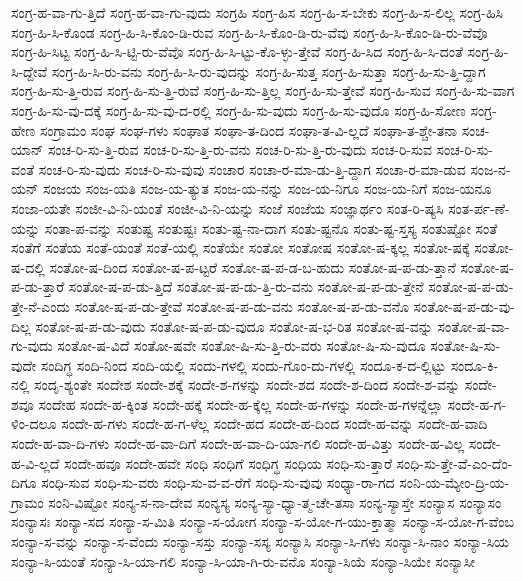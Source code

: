 {ಸಂಗ್ರ-ಹ-ವಾ-ಗು-ತ್ತಿದೆ
ಸಂಗ್ರ-ಹ-ವಾ-ಗು-ವುದು
ಸಂಗ್ರಹಿ
ಸಂಗ್ರ-ಹಿಸ
ಸಂಗ್ರ-ಹಿ-ಸ-ಬೇಕು
ಸಂಗ್ರ-ಹಿ-ಸ-ಲಿಲ್ಲ
ಸಂಗ್ರ-ಹಿಸಿ
ಸಂಗ್ರ-ಹಿ-ಸಿ-ಕೊಂಡ
ಸಂಗ್ರ-ಹಿ-ಸಿ-ಕೊಂ-ಡಿ-ರುವ
ಸಂಗ್ರ-ಹಿ-ಸಿ-ಕೊಂ-ಡಿ-ರು-ವೆವು
ಸಂಗ್ರ-ಹಿ-ಸಿ-ಕೊಂ-ಡಿ-ರು-ವೆವೊ
ಸಂಗ್ರ-ಹಿ-ಸಿಟ್ಟ
ಸಂಗ್ರ-ಹಿ-ಸಿ-ಟ್ಟಿ-ರು-ವೆವೊ
ಸಂಗ್ರ-ಹಿ-ಸಿ-ಟ್ಟು-ಕೊ-ಳ್ಳು-ತ್ತೇವೆ
ಸಂಗ್ರ-ಹಿ-ಸಿದ
ಸಂಗ್ರ-ಹಿ-ಸಿ-ದಂತೆ
ಸಂಗ್ರ-ಹಿ-ಸಿ-ದ್ದೇವೆ
ಸಂಗ್ರ-ಹಿ-ಸಿ-ರು-ವನು
ಸಂಗ್ರ-ಹಿ-ಸಿ-ರು-ವುದನ್ನು
ಸಂಗ್ರ-ಹಿ-ಸುತ್ತ
ಸಂಗ್ರ-ಹಿ-ಸುತ್ತಾ
ಸಂಗ್ರ-ಹಿ-ಸು-ತ್ತಿ-ದ್ದಾಗ
ಸಂಗ್ರ-ಹಿ-ಸು-ತ್ತಿ-ರುವ
ಸಂಗ್ರ-ಹಿ-ಸು-ತ್ತಿ-ರುವೆ
ಸಂಗ್ರ-ಹಿ-ಸು-ತ್ತಿಲ್ಲ
ಸಂಗ್ರ-ಹಿ-ಸು-ತ್ತೇವೆ
ಸಂಗ್ರ-ಹಿ-ಸುವ
ಸಂಗ್ರ-ಹಿ-ಸು-ವಾಗ
ಸಂಗ್ರ-ಹಿ-ಸು-ವು-ದಕ್ಕೆ
ಸಂಗ್ರ-ಹಿ-ಸು-ವು-ದ-ರಲ್ಲಿ
ಸಂಗ್ರ-ಹಿ-ಸು-ವುದು
ಸಂಗ್ರ-ಹಿ-ಸು-ವುದೊ
ಸಂಗ್ರ-ಹಿ-ಸೋಣ
ಸಂಗ್ರ-ಹೇಣ
ಸಂಗ್ರಾಮಂ
ಸಂಘ
ಸಂಘ-ಗಳು
ಸಂಘಾತ
ಸಂಘಾ-ತ-ದಿಂದ
ಸಂಘಾ-ತ-ವಿ-ಲ್ಲದೆ
ಸಂಘಾ-ತ-ಶ್ಚೇ-ತನಾ
ಸಂಚ-ಯಾನ್
ಸಂಚ-ರಿ-ಸು-ತ್ತಿ-ರುವ
ಸಂಚ-ರಿ-ಸು-ತ್ತಿ-ರು-ವನು
ಸಂಚ-ರಿ-ಸು-ತ್ತಿ-ರು-ವುದು
ಸಂಚ-ರಿ-ಸುವ
ಸಂಚ-ರಿ-ಸು-ವಂತೆ
ಸಂಚ-ರಿ-ಸು-ವುದು
ಸಂಚ-ರಿ-ಸು-ವುವು
ಸಂಚಾರ
ಸಂಚಾ-ರ-ಮಾ-ಡು-ತ್ತಿ-ದ್ದಾಗ
ಸಂಚಾ-ರ-ಮಾ-ಡುವ
ಸಂಜ-ನ-ಯನ್
ಸಂಜಯ
ಸಂಜ-ಯತಿ
ಸಂಜ-ಯ-ತ್ಯುತ
ಸಂಜ-ಯ-ನನ್ನು
ಸಂಜ-ಯ-ನಿಗೂ
ಸಂಜ-ಯ-ನಿಗೆ
ಸಂಜ-ಯನೂ
ಸಂಜಾ-ಯತೇ
ಸಂಜೀ-ವಿ-ನಿ-ಯಂತೆ
ಸಂಜೀ-ವಿ-ನಿ-ಯನ್ನು
ಸಂಜೆ
ಸಂಜೆಯ
ಸಂಜ್ಞಾರ್ಥಂ
ಸಂತ-ರಿ-ಷ್ಯಸಿ
ಸಂತ-ರ್ಪ-ಣೆ-ಯನ್ನು
ಸಂತಾ-ಪ-ವನ್ನು
ಸಂತುಷ್ಟ
ಸಂತುಷ್ಟಃ
ಸಂತು-ಷ್ಟ-ನಾ-ದಾಗ
ಸಂತು-ಷ್ಟನೊ
ಸಂತು-ಷ್ಟ-ಸ್ತಸ್ಯ
ಸಂತುಷ್ಟೋ
ಸಂತೆ
ಸಂತೆಗೆ
ಸಂತೆಯ
ಸಂತೆ-ಯಂತೆ
ಸಂತೆ-ಯಲ್ಲಿ
ಸಂತೆಯೇ
ಸಂತೋ
ಸಂತೋಷ
ಸಂತೋ-ಷ-ಕ್ಕಲ್ಲ
ಸಂತೋ-ಷಕ್ಕೆ
ಸಂತೋ-ಷ-ದಲ್ಲಿ
ಸಂತೋ-ಷ-ದಿಂದ
ಸಂತೋ-ಷ-ಪ-ಟ್ಟರೆ
ಸಂತೋ-ಷ-ಪ-ಡ-ಬ-ಹುದು
ಸಂತೋ-ಷ-ಪ-ಡು-ತ್ತಾನೆ
ಸಂತೋ-ಷ-ಪ-ಡು-ತ್ತಾರೆ
ಸಂತೋ-ಷ-ಪ-ಡು-ತ್ತಿದೆ
ಸಂತೋ-ಷ-ಪ-ಡು-ತ್ತಿ-ರು-ವನು
ಸಂತೋ-ಷ-ಪ-ಡು-ತ್ತೇನೆ
ಸಂತೋ-ಷ-ಪ-ಡು-ತ್ತೇ-ನೆ-ಎಂದು
ಸಂತೋ-ಷ-ಪ-ಡು-ತ್ತೇವೆ
ಸಂತೋ-ಷ-ಪ-ಡು-ವನು
ಸಂತೋ-ಷ-ಪ-ಡು-ವನೊ
ಸಂತೋ-ಷ-ಪ-ಡು-ವು-ದಿಲ್ಲ
ಸಂತೋ-ಷ-ಪ-ಡು-ವುದು
ಸಂತೋ-ಷ-ಪ-ಡು-ವುದೂ
ಸಂತೋ-ಷ-ಭ-ರಿತ
ಸಂತೋ-ಷ-ವನ್ನು
ಸಂತೋ-ಷ-ವಾ-ಗು-ವುದು
ಸಂತೋ-ಷ-ವಿದೆ
ಸಂತೋ-ಷವೇ
ಸಂತೋ-ಷಿ-ಸು-ತ್ತಿ-ರು-ವರು
ಸಂತೋ-ಷಿ-ಸು-ವುದೂ
ಸಂತೋ-ಷಿ-ಸು-ವುದೇ
ಸಂದಿಗ್ಧ
ಸಂದಿ-ನಿಂದ
ಸಂದಿ-ಯಲ್ಲಿ
ಸಂದು-ಗಳಲ್ಲಿ
ಸಂದು-ಗೊಂ-ದು-ಗಳಲ್ಲಿ
ಸಂದೂ-ಕ-ದ-ಲ್ಲಿಟ್ಟು
ಸಂದೂ-ಕಿ-ನಲ್ಲಿ
ಸಂದೃ-ಶ್ಯಂತೇ
ಸಂದೇಶ
ಸಂದೇ-ಶಕ್ಕೆ
ಸಂದೇ-ಶ-ಗಳನ್ನು
ಸಂದೇ-ಶದ
ಸಂದೇ-ಶ-ದಿಂದ
ಸಂದೇ-ಶ-ವನ್ನು
ಸಂದೇ-ಶವೂ
ಸಂದೇಹ
ಸಂದೇ-ಹ-ಕ್ಕಿಂತ
ಸಂದೇ-ಹಕ್ಕೆ
ಸಂದೇ-ಹ-ಕ್ಕೆಲ್ಲ
ಸಂದೇ-ಹ-ಗಳನ್ನು
ಸಂದೇ-ಹ-ಗಳನ್ನೆಲ್ಲಾ
ಸಂದೇ-ಹ-ಗ-ಳಿಂ-ದಲೂ
ಸಂದೇ-ಹ-ಗಳು
ಸಂದೇ-ಹ-ಗ-ಳೆಲ್ಲ
ಸಂದೇ-ಹದ
ಸಂದೇ-ಹ-ದಿಂದ
ಸಂದೇ-ಹ-ವನ್ನು
ಸಂದೇ-ಹ-ವಾದಿ
ಸಂದೇ-ಹ-ವಾ-ದಿ-ಗಳು
ಸಂದೇ-ಹ-ವಾ-ದಿಗೆ
ಸಂದೇ-ಹ-ವಾ-ದಿ-ಯಾ-ಗಲಿ
ಸಂದೇ-ಹ-ವಿತ್ತು
ಸಂದೇ-ಹ-ವಿಲ್ಲ
ಸಂದೇ-ಹ-ವಿ-ಲ್ಲದೆ
ಸಂದೇ-ಹವೂ
ಸಂದೇ-ಹವೇ
ಸಂಧಿ
ಸಂಧಿಗೆ
ಸಂಧಿಗ್ಧ
ಸಂಧಿಯ
ಸಂಧಿ-ಸು-ತ್ತಾರೆ
ಸಂಧಿ-ಸು-ತ್ತೇ-ವೆ-ಎಂ-ದೆಂ-ದಿಗೂ
ಸಂಧಿ-ಸುವ
ಸಂಧಿ-ಸು-ವರು
ಸಂಧಿ-ಸು-ವ-ವ-ರೆಗೆ
ಸಂಧಿ-ಸು-ವುವು
ಸಂಧ್ಯಾ-ರಾ-ಗದ
ಸಂನಿ-ಯ-ಮ್ಯೇಂ-ದ್ರಿ-ಯ-ಗ್ರಾಮಂ
ಸಂನಿ-ವಿಷ್ಟೋ
ಸಂನ್ಯ-ಸ-ನಾ-ದೇವ
ಸಂನ್ಯಸ್ಯ
ಸಂನ್ಯ-ಸ್ಯಾ-ಧ್ಯಾ-ತ್ಮ-ಚೇ-ತಸಾ
ಸಂನ್ಯ-ಸ್ಯಾಸ್ತೇ
ಸಂನ್ಯಾಸ
ಸಂನ್ಯಾಸಂ
ಸಂನ್ಯಾಸಃ
ಸಂನ್ಯಾ-ಸದ
ಸಂನ್ಯಾ-ಸ-ಮಿತಿ
ಸಂನ್ಯಾ-ಸ-ಯೋಗ
ಸಂನ್ಯಾ-ಸ-ಯೋ-ಗ-ಯು-ಕ್ತಾತ್ಮಾ
ಸಂನ್ಯಾ-ಸ-ಯೋ-ಗ-ವೆಂಬ
ಸಂನ್ಯಾ-ಸ-ವನ್ನು
ಸಂನ್ಯಾ-ಸ-ವೆಂದು
ಸಂನ್ಯಾ-ಸಸ್ತು
ಸಂನ್ಯಾ-ಸಸ್ಯ
ಸಂನ್ಯಾಸಿ
ಸಂನ್ಯಾ-ಸಿ-ಗಳು
ಸಂನ್ಯಾ-ಸಿ-ನಾಂ
ಸಂನ್ಯಾ-ಸಿಯ
ಸಂನ್ಯಾ-ಸಿ-ಯಂತೆ
ಸಂನ್ಯಾ-ಸಿ-ಯಾ-ಗಲಿ
ಸಂನ್ಯಾ-ಸಿ-ಯಾ-ಗಿ-ರು-ವನೊ
ಸಂನ್ಯಾ-ಸಿಯೆ
ಸಂನ್ಯಾ-ಸಿಯೇ
ಸಂನ್ಯಾಸೀ
}
